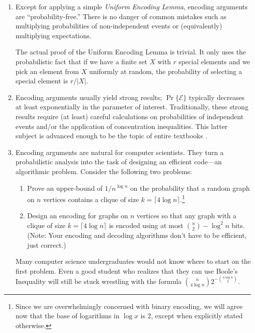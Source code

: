 \documentclass[format=acmsmall, review=false, screen=true]{acmart}
\begin{document}
\begin{enumerate}
\item Except for
  applying a simple \emph{Uniform Encoding Lemma}, 
  encoding arguments are ``probability-free.''
  There is no danger of
  common mistakes such as multiplying probabilities of non-independent
  events or (equivalently) multiplying expectations.

  The actual proof of the Uniform Encoding Lemma is trivial. It only
  uses the probabilistic fact that if we have a finite set $X$
  with $r$ special elements and we pick an element from $X$ uniformly at
  random, the probability of selecting a special element
  is $r/|X|$.

\item Encoding arguments usually yield strong results;
  $\Pr\{\mathcal{E}\}$ typically decreases at least exponentially in
  the parameter of interest. Traditionally, these strong 
  results require (at least) careful calculations on probabilities of
  independent events and/or the application of concentration
  inequalities.  This latter subject is advanced
  enough to be the topic of entire textbooks
  \cite{boucheron.lugosi.ea:concentration,dubhashi.panconesi:concentration}.
  
\item Encoding arguments are natural for computer scientists. They
  turn a probabilistic analysis into the task of designing
  an efficient code---an algorithmic problem. Consider the following
  two problems:
  \begin{enumerate}

  \item Prove an upper-bound of $1/n^{\log n}$ on the probability that
    a random graph on $n$ vertices contains a clique of size $k=\lceil
    4\log n\rceil$.\footnote{Since we are overwhelmingly concerned with
    binary encoding, we will
    agree now that the base of logarithms in $\log x$ is $2$, except when
    explicitly stated otherwise.}

  \item Design an encoding for graphs on $n$ vertices so that any graph
    with a clique of size $k=\lceil 4\log n\rceil$ is
    encoded using at most $\binom{n}{2}-\log^2 n$ bits. (Note: Your
    encoding and decoding algorithms don't have to be efficient, just
    correct.)
  \end{enumerate}
  Many computer science undergraduates would not know where to start
  on the first problem.  Even a good student who realizes that they
  can use Boole's Inequality will still be stuck wrestling with the
  formula $\binom{n}{4\log n}2^{-\binom{4\log n}{2}}$.
\end{enumerate}
\end{document}
